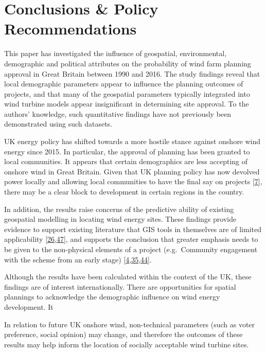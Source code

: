 \documentclass[a4paper,]{article}
\theoremstyle{definition}
\theoremstyle{definition}
\theoremstyle{definition}
\theoremstyle{remark}
\begin{document}
\section{Conclusions \& Policy
Recommendations}\label{conclusions-policy-recommendations}

This paper has investigated the influence of geospatial, environmental,
demographic and political attributes on the probability of wind farm
planning approval in Great Britain between 1990 and 2016. The study
findings reveal that local demographic parameters appear to influence
the planning outcomes of projects, and that many of the geospatial
parameters typically integrated into wind turbine models appear
insignificant in determining site approval. To the authors' knowledge,
such quantitative findings have not previously been demonstrated using
such datasets.

UK energy policy has shifted towards a more hostile stance against
onshore wind energy since 2015. In particular, the approval of planning
has been granted to local communities. It appears that certain
demographics are less accepting of onshore wind in Great Britain. Given
that UK planning policy has now devolved power locally and allowing
local communities to have the final say on projects
{[}\protect\hyperlink{ref-Smith2016}{7}{]}, there may be a clear block
to development in certain regions in the country.

In addition, the results raise concerns of the predictive ability of
existing geospatial modelling in locating wind energy sites. These
findings provide evidence to support existing literature that GIS tools
in themselves are of limited applicability
{[}\protect\hyperlink{ref-Malczewski2004}{26},\protect\hyperlink{ref-Toke2005}{47}{]},
and supports the conclusion that greater emphasis needs to be given to
the non-physical elements of a project (e.g.~Community engagement with
the scheme from an early stage)
{[}\protect\hyperlink{ref-Wolsink2000}{4},\protect\hyperlink{ref-Toke2008}{35},\protect\hyperlink{ref-Warren2010}{44}{]}.

Although the results have been calculated within the context of the UK,
these findings are of interest internationally. There are opportunities
for spatial plannings to acknowledge the demographic influence on wind
energy development. It

In relation to future UK onshore wind, non-technical parameters (such as
voter preference, social opinion) may change, and therefore the outcomes
of these results may help inform the location of socially acceptable
wind turbine sites.
\end{document}

